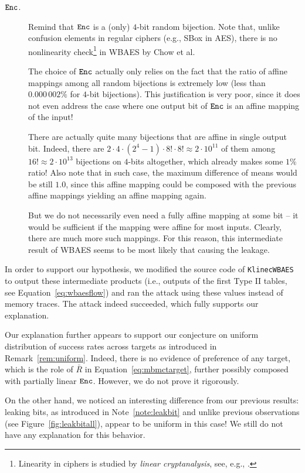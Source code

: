 \begin{description}
	\item[$\texttt{Enc}$.] Remind that $\texttt{Enc}$ is a (only) $4$-bit random bijection. Note that, unlike confusion elements in regular ciphers (e.g., SBox in AES), there is no nonlinearity check\footnote{Linearity in ciphers is studied by {\em linear cryptanalysis}, see, e.g., \cite{matsui1993linear}.} in WBAES by Chow et al.
	
	The choice of $\texttt{Enc}$ actually only relies on the fact that the ratio of affine mappings among all random bijections is extremely low (less than $0.000\,002\%$ for $4$-bit bijections). This justification is very poor, since it does not even address the case where one output bit of $\texttt{Enc}$ is an affine mapping of the input!
	
	There are actually quite many bijections that are affine in single output bit. Indeed, there are $2\cdot4\cdot(2^4-1)\cdot8!\cdot8! \approx 2\cdot10^{11}$ of them among $16! \approx 2\cdot10^{13}$ bijections on $4$-bits altogether, which already makes some $1\%$ ratio! Also note that in such case, the maximum difference of means would be still $1.0$, since this affine mapping could be composed with the previous affine mappings yielding an affine mapping again.
	
	But we do not necessarily even need a fully affine mapping at some bit -- it would be sufficient if the mapping were affine for most inputs. Clearly, there are much more such mappings. For this reason, this intermediate result of WBAES seems to be most likely that causing the leakage.
\end{description}

In order to support our hypothesis, we modified the source code of {\tt KlinecWBAES} to output these intermediate products (i.e., outputs of the first Type II tables, see Equation~\ref{eq:wbaesflow}) and ran the attack using these values instead of memory traces. The attack indeed succeeded, which fully supports our explanation.

\begin{note}
\label{note:leakbituniform}
	Our explanation further appears to support our conjecture on uniform distribution of success rates across targets as introduced in Remark~\ref{rem:uniform}. Indeed, there is no evidence of preference of any target, which is the role of $\bar R$ in Equation~\ref{eq:mbmctarget}, further possibly composed with partially linear $\texttt{Enc}$. However, we do not prove it rigorously.
	
	On the other hand, we noticed an interesting difference from our previous results: leaking bits, as introduced in Note~\ref{note:leakbit} and unlike previous observations (see Figure~\ref{fig:leakbitall}), appear to be uniform in this case! We still do not have any explanation for this behavior.
\end{note}

